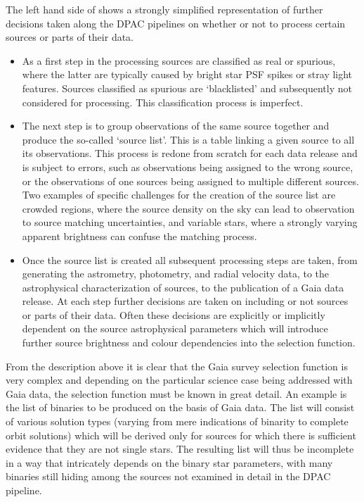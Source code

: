 The left hand side of  shows a strongly simplified representation of further decisions taken along the DPAC pipelines on whether or not to process certain sources or parts of their data.
\begin{itemize}
    \item As a first step in the processing sources are classified as real or spurious, where the latter are typically caused by bright star PSF spikes or stray light features. Sources classified as spurious are `blacklisted' and subsequently not considered for processing. This classification process is imperfect.
    \item The next step is to group observations of the same source together and produce the so-called `source list'. This is a table linking a given source to all its observations. This process is redone from scratch for each data release and is subject to errors, such as observations being assigned to the wrong source, or the observations of one sources being assigned to multiple different sources. Two examples of specific challenges for the creation of the source list are crowded regions, where the source density on the sky can lead to observation to source matching uncertainties, and variable stars, where a strongly varying apparent brightness can confuse the matching process.
    \item Once the source list is created all subsequent processing steps are taken, from generating the astrometry, photometry, and radial velocity data, to the astrophysical characterization of sources, to the publication of a Gaia data release. At each step further decisions are taken on including or not sources or parts of their data. Often these decisions are explicitly or implicitly dependent on the source astrophysical parameters which will introduce further source brightness and colour dependencies into the selection function.
\end{itemize}

From the description above it is clear that the Gaia survey selection function is very complex and depending on the particular science case being addressed with Gaia data, the selection function must be known in great detail. An example is the list of binaries to be produced on the basis of Gaia data. The list will consist of various solution types (varying from mere indications of binarity to complete orbit solutions) which will be derived only for sources for which there is sufficient evidence that they are not single stars. The resulting list will thus be incomplete in a way that intricately depends on the binary star parameters, with many binaries still hiding among the sources not examined in detail in the DPAC pipeline.

